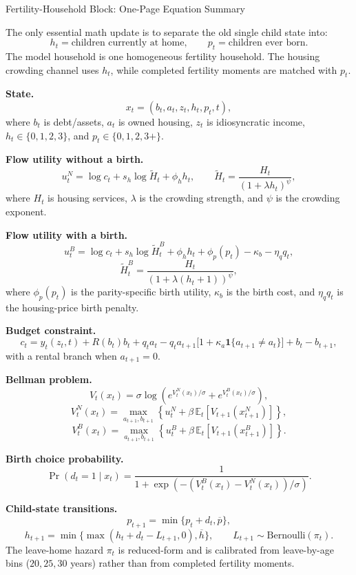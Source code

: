 \documentclass[10pt]{article}
\begin{document}
\small

{\Large Fertility-Household Block: One-Page Equation Summary}\par

The only essential math update is to separate the old single child state into:
\[
h_t = \text{children currently at home}, \qquad p_t = \text{children ever born}.
\]
The model household is one homogeneous fertility household.  The housing crowding channel uses
$h_t$, while completed fertility moments are matched with $p_t$.

\textbf{State.}
\[
x_t=(b_t,a_t,z_t,h_t,p_t,t),
\]
where $b_t$ is debt/assets, $a_t$ is owned housing, $z_t$ is idiosyncratic income, $h_t\in\{0,1,2,3\}$,
and $p_t\in\{0,1,2,3+\}$.

\textbf{Flow utility without a birth.}
\[
u_t^{N}=\log c_t+s_h\log \widetilde{H}_t+\phi_h h_t,
\qquad
\widetilde{H}_t=\frac{H_t}{(1+\lambda h_t)^{\psi}},
\]
where $H_t$ is housing services, $\lambda$ is the crowding strength, and $\psi$ is the crowding exponent.

\textbf{Flow utility with a birth.}
\[
u_t^{B}=\log c_t+s_h\log \widetilde{H}_t^{B}+\phi_h h_t
+\phi_p(p_t)-\kappa_b-\eta_q q_t,
\]
\[
\widetilde{H}_t^{B}=\frac{H_t}{(1+\lambda (h_t+1))^{\psi}},
\]
where $\phi_p(p_t)$ is the parity-specific birth utility, $\kappa_b$ is the birth cost, and $\eta_q q_t$
is the housing-price birth penalty.

\textbf{Budget constraint.}
\[
c_t = y_t(z_t,t) + R(b_t)b_t + q_t a_t
- q_t a_{t+1}\bigl[1+\kappa_a \mathbf{1}\{a_{t+1}\neq a_t\}\bigr]
 + b_t - b_{t+1},
\]
with a rental branch when $a_{t+1}=0$.

\textbf{Bellman problem.}
\[
V_t(x_t)=\sigma \log\!\left(e^{V_t^{N}(x_t)/\sigma}+e^{V_t^{B}(x_t)/\sigma}\right),
\]
\[
V_t^{N}(x_t)=\max_{a_{t+1},b_{t+1}}
\left\{u_t^{N}+\beta\,\mathbb E_t[V_{t+1}(x_{t+1}^{N})]\right\},
\]
\[
V_t^{B}(x_t)=\max_{a_{t+1},b_{t+1}}
\left\{u_t^{B}+\beta\,\mathbb E_t[V_{t+1}(x_{t+1}^{B})]\right\}.
\]

\textbf{Birth choice probability.}
\[
\Pr(d_t=1\mid x_t)=
\frac{1}{1+\exp\!\left(-(V_t^{B}(x_t)-V_t^{N}(x_t))/\sigma\right)}.
\]

\textbf{Child-state transitions.}
\[
p_{t+1}=\min\{p_t+d_t,\overline p\},
\]
\[
h_{t+1}=\min\{\max(h_t+d_t-L_{t+1},0),\overline h\},
\qquad
L_{t+1}\sim \text{Bernoulli}(\pi_t).
\]
The leave-home hazard $\pi_t$ is reduced-form and is calibrated from leave-by-age bins
($20,25,30$ years) rather than from completed fertility moments.
\end{document}
